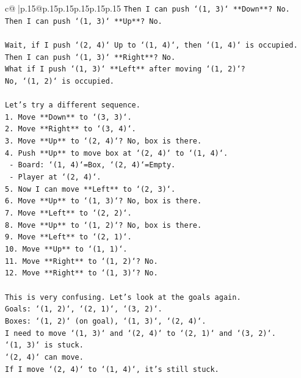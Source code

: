 \documentclass{article}
\begin{document}
{\begin{supertabular}{c@{$\;$}|p{.15\linewidth}@{}p{.15\linewidth}p{.15\linewidth}p{.15\linewidth}p{.15\linewidth}p{.15\linewidth}}
{{{\texttt{Then I can push `(1, 3)` **Down**? No.} \\
\texttt{Then I can push `(1, 3)` **Up**? No.} \\
\\ 
\texttt{Wait, if I push `(2, 4)` Up to `(1, 4)`, then `(1, 4)` is occupied.} \\
\texttt{Then I can push `(1, 3)` **Right**? No.} \\
\texttt{What if I push `(1, 3)` **Left** after moving `(1, 2)`?} \\
\texttt{No, `(1, 2)` is occupied.} \\
\\ 
\texttt{Let's try a different sequence.} \\
\texttt{1. Move **Down** to `(3, 3)`.} \\
\texttt{2. Move **Right** to `(3, 4)`.} \\
\texttt{3. Move **Up** to `(2, 4)`? No, box is there.} \\
\texttt{4. Push **Up** to move box at `(2, 4)` to `(1, 4)`.} \\
\texttt{   {-} Board: `(1, 4)`=Box, `(2, 4)`=Empty.} \\
\texttt{   {-} Player at `(2, 4)`.} \\
\texttt{5. Now I can move **Left** to `(2, 3)`.} \\
\texttt{6. Move **Up** to `(1, 3)`? No, box is there.} \\
\texttt{7. Move **Left** to `(2, 2)`.} \\
\texttt{8. Move **Up** to `(1, 2)`? No, box is there.} \\
\texttt{9. Move **Left** to `(2, 1)`.} \\
\texttt{10. Move **Up** to `(1, 1)`.} \\
\texttt{11. Move **Right** to `(1, 2)`? No.} \\
\texttt{12. Move **Right** to `(1, 3)`? No.} \\
\\ 
\texttt{This is very confusing. Let's look at the goals again.} \\
\texttt{Goals: `(1, 2)`, `(2, 1)`, `(3, 2)`.} \\
\texttt{Boxes: `(1, 2)` (on goal), `(1, 3)`, `(2, 4)`.} \\
\texttt{I need to move `(1, 3)` and `(2, 4)` to `(2, 1)` and `(3, 2)`.} \\
\texttt{`(1, 3)` is stuck.} \\
\texttt{`(2, 4)` can move.} \\
\texttt{If I move `(2, 4)` to `(1, 4)`, it's still stuck.} \\
}}}
\end{supertabular}}
\end{document}
